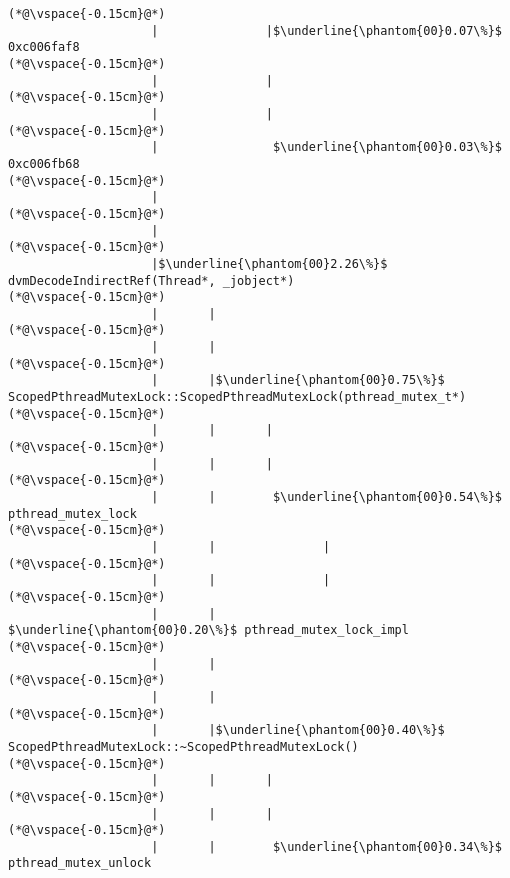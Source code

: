 \begin{lstlisting}[caption=20 viiteparametria (C$\to$Java) , label=profile:C2JBenchmark00206, numberbychapter=true, frame=lines]
(*@\vspace{-0.15cm}@*)
                    |               |$\underline{\phantom{00}0.07\%}$ 0xc006faf8
(*@\vspace{-0.15cm}@*)
                    |               |
(*@\vspace{-0.15cm}@*)
                    |               |
(*@\vspace{-0.15cm}@*)
                    |                $\underline{\phantom{00}0.03\%}$ 0xc006fb68
(*@\vspace{-0.15cm}@*)
                    |
(*@\vspace{-0.15cm}@*)
                    |
(*@\vspace{-0.15cm}@*)
                    |$\underline{\phantom{00}2.26\%}$ dvmDecodeIndirectRef(Thread*, _jobject*)
(*@\vspace{-0.15cm}@*)
                    |       |
(*@\vspace{-0.15cm}@*)
                    |       |
(*@\vspace{-0.15cm}@*)
                    |       |$\underline{\phantom{00}0.75\%}$ ScopedPthreadMutexLock::ScopedPthreadMutexLock(pthread_mutex_t*)
(*@\vspace{-0.15cm}@*)
                    |       |       |
(*@\vspace{-0.15cm}@*)
                    |       |       |
(*@\vspace{-0.15cm}@*)
                    |       |        $\underline{\phantom{00}0.54\%}$ pthread_mutex_lock
(*@\vspace{-0.15cm}@*)
                    |       |               |
(*@\vspace{-0.15cm}@*)
                    |       |               |
(*@\vspace{-0.15cm}@*)
                    |       |                $\underline{\phantom{00}0.20\%}$ pthread_mutex_lock_impl
(*@\vspace{-0.15cm}@*)
                    |       |
(*@\vspace{-0.15cm}@*)
                    |       |
(*@\vspace{-0.15cm}@*)
                    |       |$\underline{\phantom{00}0.40\%}$ ScopedPthreadMutexLock::~ScopedPthreadMutexLock()
(*@\vspace{-0.15cm}@*)
                    |       |       |
(*@\vspace{-0.15cm}@*)
                    |       |       |
(*@\vspace{-0.15cm}@*)
                    |       |        $\underline{\phantom{00}0.34\%}$ pthread_mutex_unlock

\end{lstlisting}
